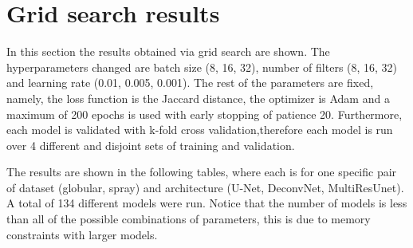 
\chapter{Grid search results}\label{appendix_gs}
In this section the results obtained via grid search are shown. The hyperparameters changed are batch size (8, 16, 32), number of filters (8, 16, 32) and learning rate (0.01, 0.005, 0.001). The rest of the parameters are fixed, namely, the loss function is the Jaccard distance, the optimizer is Adam and a maximum of 200 epochs is used with early stopping of patience 20. Furthermore, each model is validated with k-fold cross validation,therefore each model is run over 4 different and disjoint sets of training and validation.

The results are shown in the following tables, where each is for one specific pair of dataset (globular, spray) and architecture (U-Net, DeconvNet, MultiResUnet). A total of 134 different models were run.
Notice that the number of models is less than all of the possible combinations of parameters, this is due to memory constraints with larger models.






